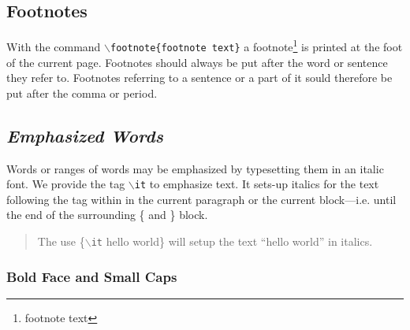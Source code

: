 \documentclass[11pt]{article}
\newcommand{\cmd}[1]{{\tt $\backslash$#1}}
\begin{document}


\subsection{Footnotes}

With the command \cmd{footnote\{footnote text\}} a
footnote\footnote{footnote text} is printed at the foot of the current
page. Footnotes should always be put after the word or sentence they
refer to. Footnotes referring to a sentence or a part of it sould
therefore be put after the comma or period.



\subsection{\emph{Emphasized Words}}

Words or ranges of words may be emphasized by typesetting them in an
italic font. We provide the tag \cmd{it} to emphasize text. It sets-up
italics for the text following the tag within in the current paragraph
or the current block---i.e. until the end of the surrounding \{ and \}
block.

\begin{quote}
  The use \{\cmd{it} hello world\} will setup the text ``hello world''
  in italics.
\end{quote}





\subsubsection{\textbf{Bold Face} and {\sc Small Caps}}
\end{document}
